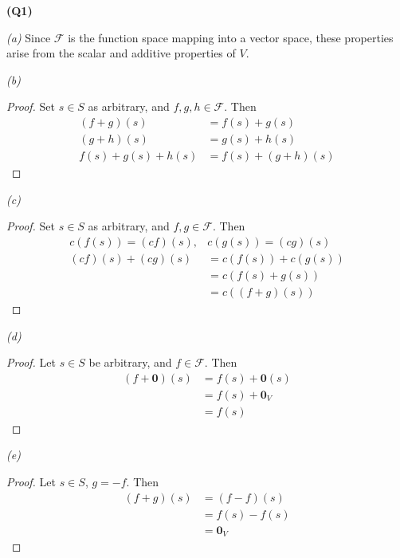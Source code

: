 \documentclass[12pt, a4paper]{article}
\newcommand{\Fcal}{\mathcal{F}}
\begin{document}
\textbf{(Q1)}

\textit{(a)} Since $\Fcal$ is the function space mapping into a vector space,
these properties arise from the scalar and additive properties of $V$.

\textit{(b)}
\begin{proof}
    Set $s \in S$ as arbitrary, and $f, g, h \in \Fcal$. Then
    \begin{align*}
        (f + g)(s) & = f(s) + g(s)\\
        (g + h)(s) & = g(s) + h(s)\\
        f(s) + g(s) + h(s) & = f(s) + (g + h)(s)
    \end{align*}
\end{proof}

\textit{(c)}
\begin{proof}
    Set $s \in S$ as arbitrary, and $f, g \in \Fcal$. Then
    \begin{align*}
        c(f(s)) = (cf)(s), & c(g(s)) = (cg)(s)\\
        (cf)(s) + (cg)(s) & = c(f(s)) + c(g(s))\\
        & = c(f(s) + g(s))\\
        & = c((f + g)(s))
    \end{align*}
\end{proof}

\textit{(d)}
\begin{proof}
    Let $s \in S$ be arbitrary, and $f \in \Fcal$. Then
    \begin{align*}
        (f + \mathbf{0})(s) & = f(s) + \mathbf{0}(s)\\
        & = f(s) + \mathbf{0}_V\\
        & = f(s)
    \end{align*}
\end{proof}

\textit{(e)}
\begin{proof}
    Let $s \in S$, $g = -f$. Then
    \begin{align*}
        (f + g)(s) & = (f - f)(s)\\
        & = f(s) - f(s)\\
        & = \mathbf{0}_V
    \end{align*}
\end{proof}
\end{document}
